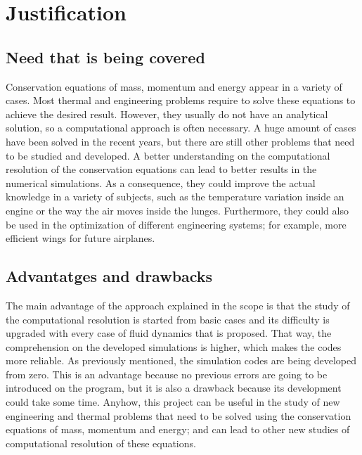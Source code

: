 
\section{Justification}
\subsection{Need that is being covered}
Conservation equations of mass, momentum and energy appear in a variety of cases. Most thermal and engineering problems require to solve these equations to achieve the desired result. However, they usually do not have an analytical solution, so a computational approach is often necessary. A huge amount of cases have been solved in the recent years, but there are still other problems that need to be studied and developed.
\newline
A better understanding on the computational resolution of the conservation equations can lead to better results in the numerical simulations. As a consequence, they could improve the actual knowledge in a variety of subjects, such as the temperature variation inside an engine or the way the air moves inside the lunges. Furthermore, they could also be used in the optimization of different engineering systems; for example, more efficient wings for future airplanes.

\subsection{Advantatges and drawbacks}
The main advantage of the approach explained in the scope is that the study of the computational resolution is started from basic cases and its difficulty is upgraded with every case of fluid dynamics that is proposed. That way, the comprehension on the developed simulations is higher, which makes the codes more reliable. As previously mentioned, the simulation codes are being developed from zero. This is an advantage because no previous errors are going to be introduced on the program, but it is also a drawback because its development could take some time.
\newline
\newline
Anyhow, this project can be useful in the study of new engineering and thermal problems that need to be solved using the conservation equations of mass, momentum and energy; and can lead to other new studies of computational resolution of these equations.
